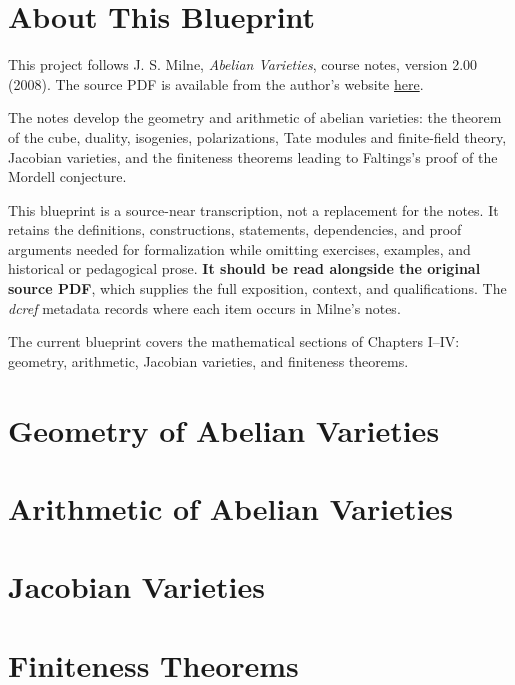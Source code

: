 

\chapter*{About This Blueprint}

This project follows J. S. Milne, \emph{Abelian Varieties}, course notes,
version 2.00 (2008). The source PDF is available from the author's website
\href{https://www.jmilne.org/math/CourseNotes/AV.pdf}{here}.

The notes develop the geometry and arithmetic of abelian varieties: the
theorem of the cube, duality, isogenies, polarizations, Tate modules and
finite-field theory, Jacobian varieties, and the finiteness theorems leading
to Faltings's proof of the Mordell conjecture.

This blueprint is a source-near transcription, not a replacement for the notes.
It retains the definitions, constructions, statements, dependencies, and proof
arguments needed for formalization while omitting exercises, examples, and
historical or pedagogical prose.
\textbf{It should be read alongside the original source PDF}, which supplies
the full exposition, context, and qualifications. The \emph{dcref} metadata
records where each item occurs in Milne's notes.

The current blueprint covers the mathematical sections of Chapters I--IV:
geometry, arithmetic, Jacobian varieties, and finiteness theorems.

\chapter{Geometry of Abelian Varieties}
\label{chap:milne-geometry}


\chapter{Arithmetic of Abelian Varieties}
\label{chap:milne-arithmetic}


\chapter{Jacobian Varieties}
\label{chap:milne-jacobians}


\chapter{Finiteness Theorems}
\label{chap:milne-finiteness}

